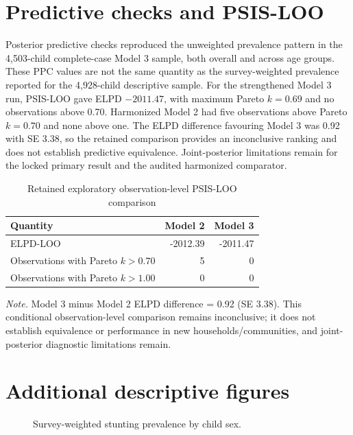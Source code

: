 \documentclass[10pt]{article}
\begin{document}
\section{Predictive checks and PSIS-LOO}

Posterior predictive checks reproduced the unweighted prevalence pattern in the 4,503-child complete-case Model 3 sample, both overall and across age groups. These PPC values are not the same quantity as the survey-weighted prevalence reported for the 4,928-child descriptive sample. For the strengthened Model 3 run, PSIS-LOO gave ELPD $-2011.47$, with maximum Pareto $k=0.69$ and no observations above 0.70. Harmonized Model 2 had five observations above Pareto $k=0.70$ and none above one. The ELPD difference favouring Model 3 was 0.92 with SE 3.38, so the retained comparison provides an inconclusive ranking and does not establish predictive equivalence. Joint-posterior limitations remain for the locked primary result and the audited harmonized comparator.


\begin{table}[H]
\centering
\caption{Retained exploratory observation-level PSIS-LOO comparison}
\small
\begin{tabular}{lrr}
\toprule
Quantity & Model 2 & Model 3 \\
\midrule
ELPD-LOO & -2012.39 & -2011.47 \\
Observations with Pareto $k>0.70$ & 5 & 0 \\
Observations with Pareto $k>1.00$ & 0 & 0 \\
\bottomrule
\end{tabular}
\begin{minipage}{0.98\textwidth}\footnotesize \textit{Note.} Model 3 minus Model 2 ELPD difference = 0.92 (SE 3.38). This conditional observation-level comparison remains inconclusive; it does not establish equivalence or performance in new households/communities, and joint-posterior diagnostic limitations remain.\end{minipage}
\end{table}

\section{Additional descriptive figures}

\begin{figure}[H]
\centering

\caption{Survey-weighted stunting prevalence by child sex.}
\end{figure}
\end{document}
